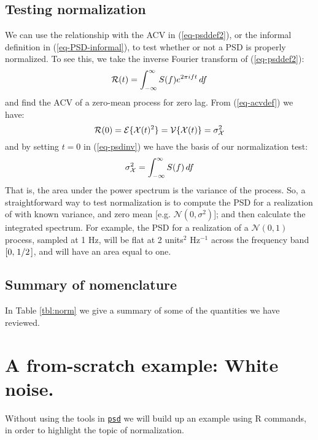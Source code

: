\documentclass[10pt]{article}\usepackage[]{graphicx}\usepackage[]{color}
\newcommand{\Rcmd}[1]{\texttt{#1}}
\newcommand{\psd}[0]{\href{http://abarbour.github.com/psd/}{\color{blue}\Rcmd{psd}}}
\newcommand{\idx}[1]{\index{#1}{#1}}
\begin{document}
\subsection{Testing normalization}
We can use the relationship with the ACV in (\ref{eq-psddef2}), or
the informal definition in (\ref{eq-PSD-informal}),
to test whether or not a PSD is properly normalized.  
To see this, we take the
inverse Fourier transform of (\ref{eq-psddef2}):
%
\begin{equation}
\label{eq-psdinv}
\mathcal{R}(t) = \int_{- \infty} ^{\infty} S(f){} e ^ {2 \pi i ft} \, df
\end{equation}
%
and find the ACV of a zero-mean 
process for zero lag.  From (\ref{eq-acvdef}) we have:
%
\begin{equation}
\label{eq-acvprop}
\mathcal{R}(0) = \mathcal{E} \{ \mathcal{X}(t){}^2 \} = \mathcal{V} \{ \mathcal{X}(t){} \} = \sigma_\mathcal{X} ^ 2
\end{equation}
%
and by setting $t = 0$ in
(\ref{eq-psdinv}) we have the basis of our normalization test:
%
\begin{equation}
\label{eq-psdnorm}
\sigma_\mathcal{X} ^ 2 = \int_{- \infty} ^{\infty} S (f) \, df
\end{equation}
%
That is,
the area under the power spectrum is the variance
of the process.
So, a straightforward way to test normalization 
is to compute the PSD for a realization of \dXstoch{} with
known variance, and zero mean [e.g. $\mathcal{N}(0,\sigma^2)$]; and then
calculate the integrated spectrum.
For example, the \idx{single-sided}
PSD for a realization of a $\mathcal{N}(0, 1)$ process, 
sampled at 1 Hz, 
will be flat at 2 units$^2$ Hz$^{-1}$
across the frequency band $[0, \left.1\middle/2\right.]$,
and will have
an area equal to one.

\subsection{Summary of nomenclature}

In Table \ref{tbl:norm} we give a summary of some
of the quantities we have reviewed.



\section{A from-scratch example: White noise.}
Without using the tools in \psd{} we will build up an example
using R commands, in order to highlight the topic of normalization.
\end{document}
